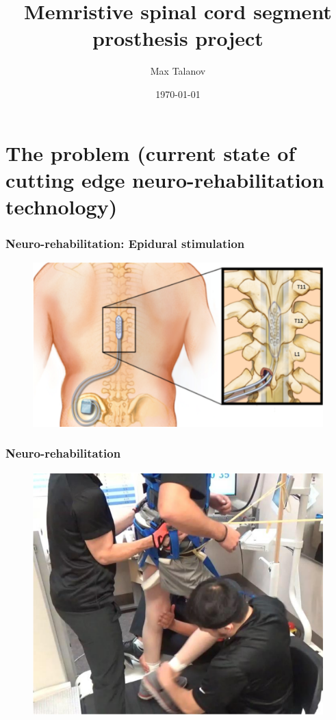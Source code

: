 \documentclass[12pt, aspectratio=169]{beamer}
\title[Memristive spinal cord segment prosthesis project]{Memristive spinal cord segment prosthesis project} %
\author[Max Talanov]{
  Max Talanov
}
\institute[Neuroscience laboratory, NcN laboratory : KFU]%
{
Neuromorphic computing and Neurosimulations laboratory/Neuroscience laboratory, KFU \\ %
\medskip
\textit{max.talanov@gmail.com} %
}
\date{\today} %
\begin{document}
\begin{frame}
\titlepage %
\end{frame}


\section{The problem (current state of cutting edge neuro-rehabilitation technology)}
\begin{frame}
  \frametitle{Neuro-rehabilitation: Epidural stimulation}
  \begin{figure}
    \includegraphics[width=0.6\linewidth]{epidural_stimulation_spinal_cord}
  \end{figure}
\end{frame}

\begin{frame}
  \frametitle{Neuro-rehabilitation}
  \begin{figure}
    \includegraphics[width=0.5\linewidth]{neurorehabilitation}
  \end{figure}
\end{frame}

\end{document}
